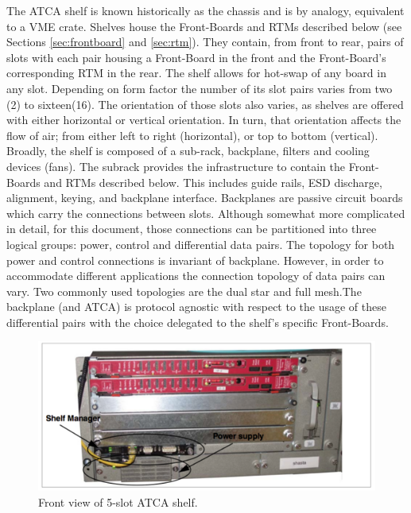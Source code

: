 The ATCA shelf is known historically as the chassis and is by analogy, equivalent to a VME crate. Shelves house the Front-Boards and RTMs described below (see Sections \ref{sec:frontboard} and \ref{sec:rtm}). They contain, from front to rear, pairs of slots with each pair housing a Front-Board in the front and the Front-Board's corresponding RTM in the rear. The shelf allows for hot-swap of any board in any slot. Depending on form factor the number of its slot pairs varies from two (2) to sixteen(16). The orientation of those slots also varies, as shelves are offered with either horizontal or vertical orientation. In turn, that orientation affects the flow of air; from either left to right (horizontal), or top to bottom (vertical).
Broadly, the shelf is composed of a sub-rack, backplane, filters and cooling devices (fans). The subrack provides the infrastructure to contain the Front-Boards and RTMs described below. This includes guide rails, ESD discharge, alignment, keying, and backplane interface. Backplanes are passive circuit boards which carry the connections between slots. Although somewhat more complicated in detail, for this document, those connections can be partitioned into three logical groups: power, control and differential data pairs. The topology for both power and control connections is invariant of backplane. However, in order to accommodate different applications the connection topology of data pairs can vary. Two commonly used topologies are the dual star and full mesh.The backplane (and ATCA) is protocol agnostic with respect to the usage of these differential pairs with the choice delegated to the shelf's specific Front-Boards.

\begin{figure}[tbh]
\includegraphics[scale=0.8]{shelf-front.pdf}
\caption{Front view of 5-slot ATCA shelf.}
\label{fig:frontShelf}
\end{figure} 


